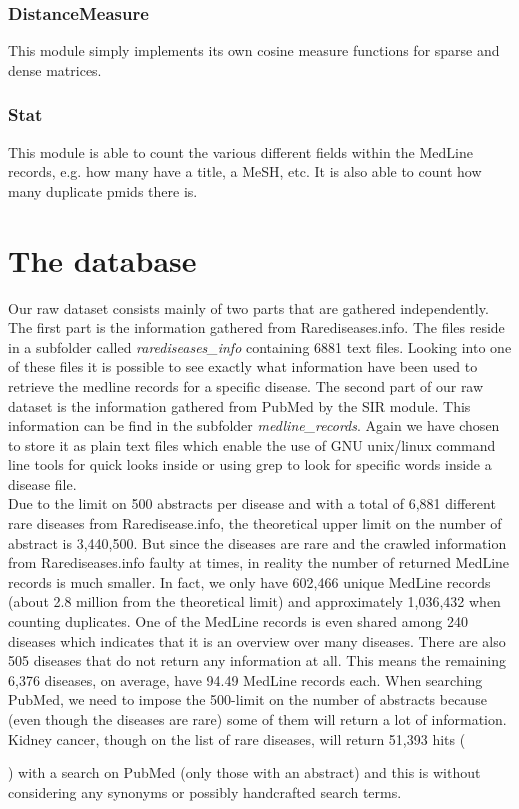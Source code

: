 \subsubsection{DistanceMeasure}
This module simply implements its own cosine measure functions for
sparse and dense matrices.

\subsubsection{Stat}
This module is able to count the various different fields within the
MedLine records, e.g. how many have a title, a MeSH, etc. It is also
able to count how many duplicate pmids there is.

\section{The database\label{Database}}

Our raw dataset consists mainly of two parts that are gathered
independently. The first part is the information gathered from
Rarediseases.info. The files reside in a subfolder called
\textit{rarediseases\_info} containing 6881 text files. Looking into
one of these files it is possible to see exactly what information have
been used to retrieve the medline records for a specific disease. The
second part of our raw dataset is the information gathered from PubMed
by the SIR module. This information can be find in the subfolder
\textit{medline\_records}. Again we have chosen to store it as plain
text files which enable the use of GNU unix/linux command line tools
for quick looks inside or using grep to look for specific words inside
a disease file.\\

Due to the limit on 500 abstracts per disease and with a total of
6,881 different rare diseases from Raredisease.info, the theoretical
upper limit on the number of abstract is 3,440,500. But since the
diseases are rare and the crawled information from Rarediseases.info
faulty at times, in reality the number of returned MedLine records is
much smaller. In fact, we only have 602,466 unique MedLine records
(about 2.8 million from the theoretical limit) and approximately
1,036,432 when counting duplicates. One of the MedLine records is even
shared among 240 diseases which indicates that it is an overview over
many diseases. There are also 505 diseases that do not return any
information at all. This means the remaining 6,376 diseases, on
average, have 94.49 MedLine records each. When searching PubMed, we
need to impose the 500-limit on the number of abstracts because (even
though the diseases are rare) some of them will return a lot of
information. Kidney cancer, though on the list of rare diseases, will
return 51,393 hits (\date{January 3, 2010}) with a search on PubMed
(only those with an abstract) and this is without considering any
synonyms or possibly handcrafted search terms. \\


